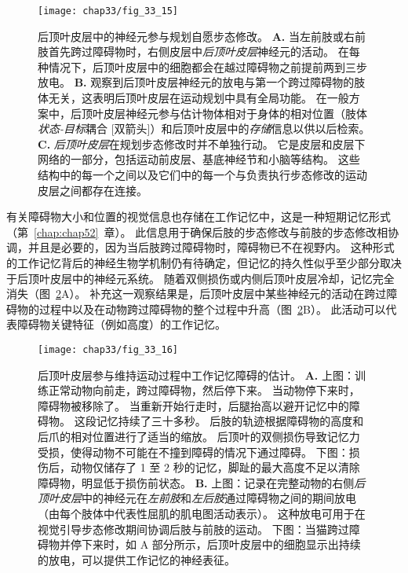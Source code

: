 \begin{figure}[htbp]
	\centering
	\texttt{[image: chap33/fig\_33\_15]}
	\caption{后顶叶皮层中的神经元参与规划自愿步态修改。
		\textbf{A.} 当左前肢或右前肢首先跨过障碍物时，右侧皮层中\textit{后顶叶皮层}神经元的活动。
		在每种情况下，后顶叶皮层中的细胞都会在越过障碍物之前提前两到三步放电。
		\textbf{B.} 观察到后顶叶皮层神经元的放电与第一个跨过障碍物的肢体无关，这表明后顶叶皮层在运动规划中具有全局功能。
		在一般方案中，后顶叶皮层神经元参与估计物体相对于身体的相对位置（肢体\textit{状态-目标}耦合 [双箭头]）和后顶叶皮层中的\textit{存储}信息以供以后检索。
		\textbf{C.} \textit{后顶叶皮层}在规划步态修改时并不单独行动。
		它是皮层和皮层下网络的一部分，包括运动前皮层、基底神经节和小脑等结构。
		这些结构中的每一个之间以及它们中的每一个与负责执行步态修改的运动皮层之间都存在连接\cite{drew2015taking}。}
	\label{fig:33_15}
\end{figure}


有关障碍物大小和位置的视觉信息也存储在工作记忆中，这是一种短期记忆形式（第~\ref{chap:chap52}~章）。
此信息用于确保后肢的步态修改与前肢的步态修改相协调，并且是必要的，因为当后肢跨过障碍物时，障碍物已不在视野内。
这种形式的工作记忆背后的神经生物学机制仍有待确定，但记忆的持久性似乎至少部分取决于后顶叶皮层中的神经元系统。
随着双侧损伤或内侧后顶叶皮层冷却，记忆完全消失（图~\ref{fig:33_16}A）。
补充这一观察结果是，后顶叶皮层中某些神经元的活动在跨过障碍物的过程中以及在动物跨过障碍物的整个过程中升高（图~\ref{fig:33_16}B）。
此活动可以代表障碍物关键特征（例如高度）的工作记忆。


\begin{figure}[htbp]
	\centering
	\texttt{[image: chap33/fig\_33\_16]}
	\caption{后顶叶皮层参与维持运动过程中工作记忆障碍的估计。
		\textbf{A.} 上图：训练正常动物向前走，跨过障碍物，然后停下来。
		当动物停下来时，障碍物被移除了。
		当重新开始行走时，后腿抬高以避开记忆中的障碍物。
		这段记忆持续了三十多秒。
		后肢的轨迹根据障碍物的高度和后爪的相对位置进行了适当的缩放。
		后顶叶的双侧损伤导致记忆力受损，使得动物不可能在不撞到障碍的情况下通过障碍。
		下图：损伤后，动物仅储存了 1 至 2 秒的记忆，脚趾的最大高度不足以清除障碍物，明显低于损伤前状态\cite{mcvea2009object}。
		\textbf{B.} 上图：记录在完整动物的右侧\textit{后顶叶皮层}中的神经元在\textit{左前肢}和\textit{左后肢}通过障碍物之间的期间放电（由每个肢体中代表性屈肌的肌电图活动表示）。
		这种放电可用于在视觉引导步态修改期间协调后肢与前肢的运动。
		下图：当猫跨过障碍物并停下来时，如 A 部分所示，后顶叶皮层中的细胞显示出持续的放电，可以提供工作记忆的神经表征\cite{lajoie2010neurons}。}
	\label{fig:33_16}
\end{figure}



